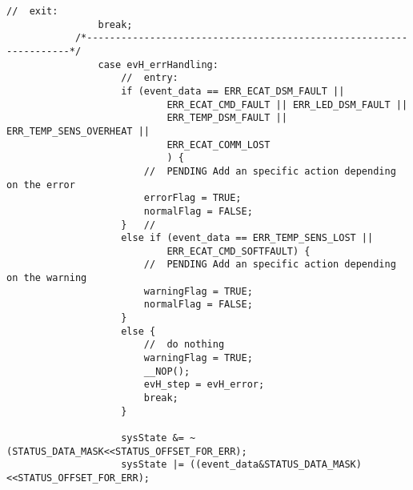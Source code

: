 \begin{lstlisting}[label=lst:event,caption={Main source code for Event Handler DSM.}]
                //	exit:
                break;
            /*-------------------------------------------------------------------*/
                case evH_errHandling:
                    //	entry:
                    if (event_data == ERR_ECAT_DSM_FAULT ||
                            ERR_ECAT_CMD_FAULT || ERR_LED_DSM_FAULT ||
                            ERR_TEMP_DSM_FAULT || ERR_TEMP_SENS_OVERHEAT ||
                            ERR_ECAT_COMM_LOST
                            ) {
                        //	PENDING Add an specific action depending on the error
                        errorFlag = TRUE;
                        normalFlag = FALSE;
                    }	//
                    else if (event_data == ERR_TEMP_SENS_LOST ||
                            ERR_ECAT_CMD_SOFTFAULT) {
                        //	PENDING Add an specific action depending on the warning
                        warningFlag = TRUE;
                        normalFlag = FALSE;
                    }
                    else {
                        //	do nothing
                        warningFlag = TRUE;
                        __NOP();
                        evH_step = evH_error;
                        break;
                    }
    
                    sysState &= ~(STATUS_DATA_MASK<<STATUS_OFFSET_FOR_ERR);
                    sysState |= ((event_data&STATUS_DATA_MASK)<<STATUS_OFFSET_FOR_ERR);
    

\end{lstlisting}
